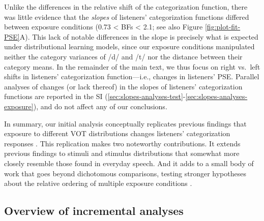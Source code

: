 \documentclass[
  11pt,
  man,mask,floatsintext]{apa6}
\begin{document}
Unlike the differences in the relative shift of the categorization function, there was little evidence that the \emph{slopes} of listeners' categorization functions differed between exposure conditions (0.73 \textless{} BFs \textless{} 2.1; see also Figure \ref{fig:plot-fit-PSE}A). This lack of notable differences in the slope is precisely what is expected under distributional learning models, since our exposure conditions manipulated neither the category variances of /d/ and /t/ nor the distance between their category means. In the remainder of the main text, we thus focus on right vs.~left shifts in listeners' categorization function---i.e., changes in listeners' PSE. Parallel analyses of changes (or lack thereof) in the slopes of listeners' categorization functions are reported in the SI (\ref{sec:slopes-analyses-test}-\ref{sec:slopes-analyses-exposure}), and do not affect any of our conclusions.

In summary, our initial analysis conceptually replicates previous findings that exposure to different VOT distributions changes listeners' categorization responses \autocites[for /b/-/p/:][]{clayards2008,kleinschmidt2015,kleinschmidt2020}[for /g/-/k/,][]{theodore-monto2019}. This replication makes two noteworthy contributions. It extends previous findings to stimuli and stimulus distributions that somewhat more closely resemble those found in everyday speech. And it adds to a small body of work that goes beyond dichotomous comparisons, testing stronger hypotheses about the relative ordering of multiple exposure conditions \autocites[e.g.,][]{babel2019,bejjanki2011,bradlow-bent2008,cummings-theodore2023,kleinschmidt2020,liu-jaeger2018}.

\subsection{Overview of incremental analyses}\label{overview-of-incremental-analyses}
\end{document}
